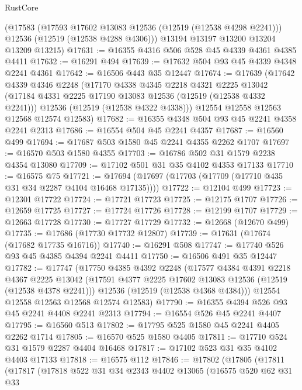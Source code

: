 \begin{lexlean}{RustCore}
\begin{coremodule}
      (@17583
        (@17593 @17602 @13083 @12536 (@12519 (@12538 @4298 @2241)))
        @12536
        (@12519 (@12538 @4288 @4306)))
      @13194
      @13197
      @13200
      @13204
      @13209
      @13215)
@17631 := @16355 @4316 @506 @528 @45 @4339 @4361 @4385 @4411
@17632 := @16291 @494
@17639 := @17632 @504 @93 @45 @4339 @4348 @2241 @4361
@17642 := @16506 @443 @35 @12447
@17674 := @17639
    (@17642
      @4339
      @4346
      @2248
      (@17170
        @4338
        @4345
        @2218
        @4321
        @2225
        @13042
        (@17184 @4331 @2225 @17190 @13083 @12536 (@12519 (@12538 @4332 @2241)))
        @12536
        (@12519 (@12538 @4322 @4338)))
      @12554
      @12558
      @12563
      @12568
      @12574
      @12583)
@17682 := @16355 @4348 @504 @93 @45 @2241 @4358 @2241 @2313
@17686 := @16554 @504 @45 @2241 @4357
@17687 := @16560 @499
@17694 := @17687 @503 @1580 @45 @2241 @4355 @2262 @1707
@17697 := @16570 @503 @1580 @4355
@17703 := @16786 @502 @31 @1579 @2238 @4354 @13080
@17709 := @17102 @501 @31 @35 @4102 @4353 @17133
@17710 := @16575 @75
@17721 := @17694 (@17697 (@17703 (@17709 (@17710 @435 @31 @34 @2287 @4104 @16468 @17135))))
@17722 := @12104 @499
@17723 := @12301 @17722
@17724 := @17721 @17723
@17725 := @12175 @1707
@17726 := @12659 @17725
@17727 := @17724 @17726
@17728 := @12199 @1707
@17729 := @12663 @17728
@17730 := @17727 @17729
@17732 := @12668 (@12670 @499)
@17735 := @17686 (@17730 @17732 @12807)
@17739 := @17631 (@17674 (@17682 @17735 @16716))
@17740 := @16291 @508
@17747 := @17740 @526 @93 @45 @4385 @4394 @2241 @4411
@17750 := @16506 @491 @35 @12447
@17782 := @17747
    (@17750
      @4385
      @4392
      @2248
      (@17577
        @4384
        @4391
        @2218
        @4367
        @2225
        @13042
        (@17591 @4377 @2225 @17602 @13083 @12536 (@12519 (@12538 @4378 @2241)))
        @12536
        (@12519 (@12538 @4368 @4384)))
      @12554
      @12558
      @12563
      @12568
      @12574
      @12583)
@17790 := @16355 @4394 @526 @93 @45 @2241 @4408 @2241 @2313
@17794 := @16554 @526 @45 @2241 @4407
@17795 := @16560 @513
@17802 := @17795 @525 @1580 @45 @2241 @4405 @2262 @1714
@17805 := @16570 @525 @1580 @4405
@17811 := @17710 @524 @31 @1579 @2287 @4404 @16468
@17817 := @17102 @523 @31 @35 @4102 @4403 @17133
@17818 := @16575 @112
@17846 := @17802
    (@17805
      (@17811
        (@17817
          (@17818
            @522
            @31
            @34
            @2343
            @4402
            @13065
            (@16575
              @520
              @62
              @31
              @33

\end{coremodule}
\end{lexlean}
